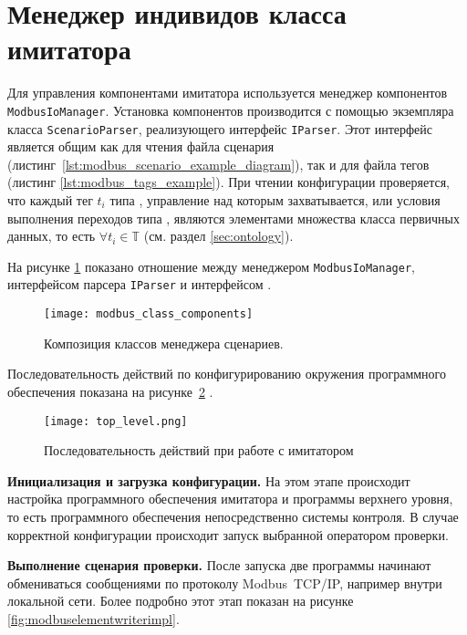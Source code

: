 \section{Менеджер индивидов класса \mbwriter имитатора}
Для управления компонентами имитатора используется менеджер компонентов \texttt{ModbusIoManager}.
Установка компонентов производится с помощью экземпляра класса \texttt{ScenarioParser}, реализующего интерфейс \texttt{IParser}.
Этот интерфейс является общим как для чтения файла сценария (листинг~\ref{lst:modbus_scenario_example_diagram}),
так и для файла тегов (листинг \ref{lst:modbus_tags_example}).
При чтении конфигурации проверяется, что каждый тег $t_i$ типа \mbdata,
управление над которым захватывается, или условия выполнения переходов типа \mbrelationed,
являются элементами множества класса первичных данных, то есть $\forall t_i \in \mathbb{T}$ (см. раздел \ref{sec:ontology}).

На рисунке \ref{fig:modbus_class_components} показано отношение между менеджером \texttt{ModbusIoManager},
интерфейсом парсера \texttt{IParser} и интерфейсом \mbwriter.
\begin{center}
    \begin{figure}[hb!]
        \texttt{[image: modbus\_class\_components]}
        \caption{Композиция классов менеджера сценариев.}\label{fig:modbus_class_components}
    \end{figure}
\end{center}


Последовательность действий по конфигурированию окружения программного обеспечения
показана на рисунке~\ref{fig:top_level_sequence} \cite[стр. 239]{book:oop:oop_analize}.
\begin{center}
    \begin{figure}
        \texttt{[image: top\_level.png]}
        \caption{Последовательность действий при работе с имитатором}
        \label{fig:top_level_sequence}
    \end{figure}
\end{center}

\textbf{Инициализация и загрузка конфигурации.}
На этом этапе происходит настройка программного обеспечения
имитатора и программы верхнего уровня,
то есть программного обеспечения непосредственно системы контроля.
В случае корректной конфигурации происходит запуск
выбранной оператором проверки.

\textbf{Выполнение сценария проверки.}
После запуска две программы начинают обмениваться 
сообщениями по протоколу Modbus~TCP/IP, например внутри локальной сети.
Более подробно этот этап показан на рисунке \ref{fig:modbuselementwriterimpl}.

